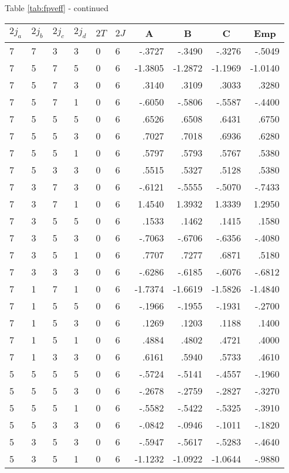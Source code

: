 \begin{center}{Table \ref{tab:fpveff} - continued}\end{center}
\clearpage
\small
\begin{center}
\begin{tabular}{llllllrrrr}
\hline
$2j_{a}$&$2j_{b}$&$2j_{c}$&$2j_{d}$&$2T$&$2J$&
\multicolumn{1}{c}{A}&
\multicolumn{1}{c}{B}&
\multicolumn{1}{c}{C}&
\multicolumn{1}{c}{Emp}\\\hline
  7& 7& 3& 3& 0& 6&  -.3727&  -.3490&  -.3276&  -.5049\\
  7& 5& 7& 5& 0& 6& -1.3805& -1.2872& -1.1969& -1.0140\\
  7& 5& 7& 3& 0& 6&   .3140&   .3109&   .3033&   .3280\\
  7& 5& 7& 1& 0& 6&  -.6050&  -.5806&  -.5587&  -.4400\\
  7& 5& 5& 5& 0& 6&   .6526&   .6508&   .6431&   .6750\\
  7& 5& 5& 3& 0& 6&   .7027&   .7018&   .6936&   .6280\\
  7& 5& 5& 1& 0& 6&   .5797&   .5793&   .5767&   .5380\\
  7& 5& 3& 3& 0& 6&   .5515&   .5327&   .5128&   .5380\\
  7& 3& 7& 3& 0& 6&  -.6121&  -.5555&  -.5070&  -.7433\\
  7& 3& 7& 1& 0& 6&  1.4540&  1.3932&  1.3339&  1.2950\\
  7& 3& 5& 5& 0& 6&   .1533&   .1462&   .1415&   .1580\\
  7& 3& 5& 3& 0& 6&  -.7063&  -.6706&  -.6356&  -.4080\\
  7& 3& 5& 1& 0& 6&   .7707&   .7277&   .6871&   .5180\\
  7& 3& 3& 3& 0& 6&  -.6286&  -.6185&  -.6076&  -.6812\\
  7& 1& 7& 1& 0& 6& -1.7374& -1.6619& -1.5826& -1.4840\\
  7& 1& 5& 5& 0& 6&  -.1966&  -.1955&  -.1931&  -.2700\\
  7& 1& 5& 3& 0& 6&   .1269&   .1203&   .1188&   .1400\\
  7& 1& 5& 1& 0& 6&   .4884&   .4802&   .4721&   .4000\\
  7& 1& 3& 3& 0& 6&   .6161&   .5940&   .5733&   .4610\\
  5& 5& 5& 5& 0& 6&  -.5724&  -.5141&  -.4557&  -.1960\\
  5& 5& 5& 3& 0& 6&  -.2678&  -.2759&  -.2827&  -.3270\\
  5& 5& 5& 1& 0& 6&  -.5582&  -.5422&  -.5325&  -.3910\\
  5& 5& 3& 3& 0& 6&  -.0842&  -.0946&  -.1011&  -.1820\\
  5& 3& 5& 3& 0& 6&  -.5947&  -.5617&  -.5283&  -.4640\\
  5& 3& 5& 1& 0& 6& -1.1232& -1.0922& -1.0644&  -.9880\\
\hline
\end{tabular}
\end{center}
